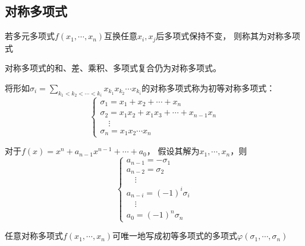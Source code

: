 \subsection{对称多项式}

\begin{definition}[对称多项式]
  若多元多项式$f(x_1,\cdots,x_n)$互换任意$x_i,x_j$后多项式保持不变，
  则称其为对称多项式
\end{definition}


\begin{theorem}[对称多项式的性质]
  对称多项式的和、差、乘积、多项式复合仍为对称多项式。
\end{theorem}

\begin{definition}[初等对称多项式]
  将形如$\sigma_i = \sum \limits_{k_1 < k_2 < \cdots < k_i}x_{k_1}x_{k_2}\cdots x_{k_i}$的对称多项式称为初等对称多项式：
  \begin{equation*}
    \begin{cases}
      \sigma_{1} = x_1 + x_2 + \cdots + x_n\\
      \sigma_2 = x_1x_2 + x_1x_3 + \cdots + x_{n-1}x_n\\
      \quad \vdots\\
      \sigma_n = x_1x_2 \cdots x_n
    \end{cases}
  \end{equation*}
\end{definition}


\begin{theorem}[Vieta定理]
  对于$f(x) = x^n + a_{n-1}x^{n-1} + \cdots + a_0$，
  假设其解为$x_1,\cdots,x_n$，则
  \begin{equation*}
    \begin{cases}
      a_{n-1} = -\sigma_1\\
      a_{n-2} = \sigma_2\\
      \quad \vdots\\
      a_{n-i} = (-1)^i\sigma_i\\
      \quad \vdots\\
      a_0 = (-1)^n\sigma_n
    \end{cases}
  \end{equation*}
\end{theorem}

\begin{theorem}[复合定理]
  任意对称多项式$f(x_1,\cdots,x_n)$可唯一地写成初等多项式的多项式$\varphi(\sigma_1,\cdots,\sigma_n)$
\end{theorem}

